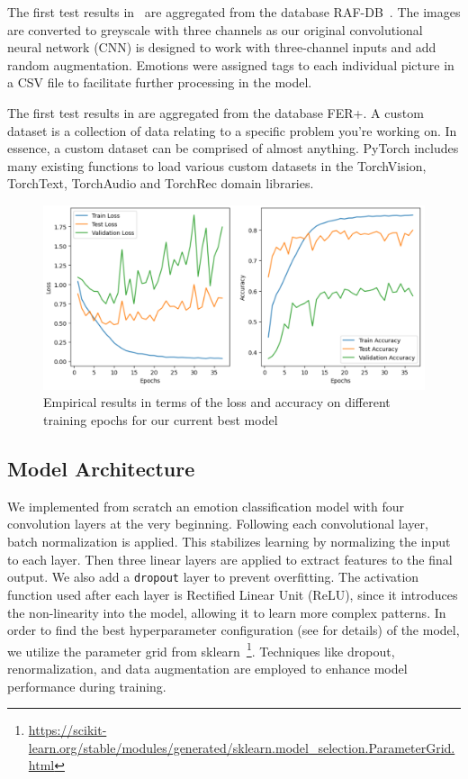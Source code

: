 The first test results in~ are aggregated from the database RAF-DB~\cite{li_reliable_2017,li2019reliable}. 
The images are converted to greyscale with three channels as our original convolutional neural network (CNN) is designed to work with three-channel inputs and add random augmentation. 
Emotions were assigned tags to each individual picture in a CSV file to facilitate further processing in the model.

The first test results in  are aggregated from the database FER+. %
A custom dataset is a collection of data relating to a specific problem you're working on.
In essence, a custom dataset can be comprised of almost anything.
PyTorch includes many existing functions to load various custom datasets in the TorchVision, TorchText, TorchAudio and TorchRec domain libraries.


\begin{figure}[ht]
  \centering
   \includegraphics[width=\linewidth]{output.png}
   \caption{Empirical results in terms of the loss and accuracy on different training epochs for our current best model} %
   \label{fig:result}
\end{figure}

\subsection{Model Architecture}
We implemented from scratch an emotion classification model with four convolution layers at the very beginning. 
Following each convolutional layer, 
batch normalization is applied. 
This stabilizes learning by normalizing the input to each layer. 
Then three linear layers are applied to extract features to the final output. 
We also add a \texttt{dropout} layer to prevent overfitting. 
The activation function used after each layer is Rectified Linear Unit (ReLU), 
since it introduces the non-linearity into the model, 
allowing it to learn more complex patterns. 
In order to find the best hyperparameter configuration (see  for details) of the model, 
we utilize the parameter grid from sklearn~\footnote{\url{https://scikit-learn.org/stable/modules/generated/sklearn.model_selection.ParameterGrid.html}}.
Techniques like dropout, renormalization, and data augmentation are employed to enhance model performance during training.

